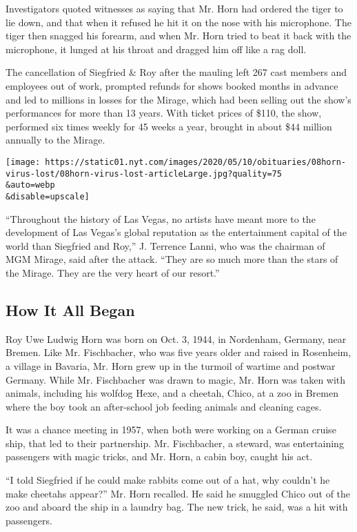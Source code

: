 Investigators quoted witnesses as saying that Mr. Horn had ordered the
tiger to lie down, and that when it refused he hit it on the nose with
his microphone. The tiger then snagged his forearm, and when Mr. Horn
tried to beat it back with the microphone, it lunged at his throat and
dragged him off like a rag doll.

The cancellation of Siegfried \& Roy after the mauling left 267 cast
members and employees out of work, prompted refunds for shows booked
months in advance and led to millions in losses for the Mirage, which
had been selling out the show's performances for more than 13 years.
With ticket prices of \$110, the show, performed six times weekly for 45
weeks a year, brought in about \$44 million annually to the Mirage.

\texttt{[image: https://static01.nyt.com/images/2020/05/10/obituaries/08horn-virus-lost/08horn-virus-lost-articleLarge.jpg?quality=75\\\&auto=webp\\\&disable=upscale]}

``Throughout the history of Las Vegas, no artists have meant more to the
development of Las Vegas's global reputation as the entertainment
capital of the world than Siegfried and Roy,'' J. Terrence Lanni, who
was the chairman of MGM Mirage, said after the attack. ``They are so
much more than the stars of the Mirage. They are the very heart of our
resort.''

\hypertarget{how-it-all-began}{%
\subsection{How It All Began}\label{how-it-all-began}}

Roy Uwe Ludwig Horn was born on Oct. 3, 1944, in Nordenham, Germany,
near Bremen. Like Mr. Fischbacher, who was five years older and raised
in Rosenheim, a village in Bavaria, Mr. Horn grew up in the turmoil of
wartime and postwar Germany. While Mr. Fischbacher was drawn to magic,
Mr. Horn was taken with animals, including his wolfdog Hexe, and a
cheetah, Chico, at a zoo in Bremen where the boy took an after-school
job feeding animals and cleaning cages.

It was a chance meeting in 1957, when both were working on a German
cruise ship, that led to their partnership. Mr. Fischbacher, a steward,
was entertaining passengers with magic tricks, and Mr. Horn, a cabin
boy, caught his act.

``I told Siegfried if he could make rabbits come out of a hat, why
couldn't he make cheetahs appear?'' Mr. Horn recalled. He said he
smuggled Chico out of the zoo and aboard the ship in a laundry bag. The
new trick, he said, was a hit with passengers.

